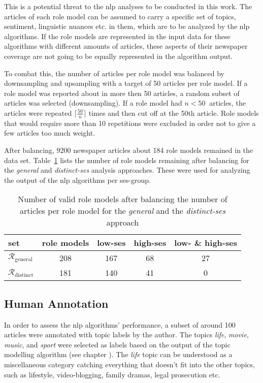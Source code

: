 This is a potential threat to the \gls{nlp} analyses to be conducted in this work. The articles of each role model can be assumed to carry a specific set of topics, sentiment, linguistic nuances etc. in them, which are to be analyzed by the \gls{nlp} algorithms. If the role models are represented in the input data for these algorithms with different amounts of articles, these aspects of their newspaper coverage are not going to be equally represented in the algorithm output.

To combat this, the number of articles per role model was balanced by downsampling and upsampling \autocite{kumar_5_2021} with a target of \SI{50}{} articles per role model. If a role model was reported about in more then \SI{50}{} articles, a random subset of articles was selected (downsampling). If a role model had $n < \SI{50}{}$ articles, the articles were repeated $\lceil \frac{50}{n} \rceil$ times and then cut off at the 50th article. Role models that would require more than \SI{10}{} repetitions were excluded in order not to give a few articles too much weight.

After balancing, \SI{9200}{} newspaper articles about \SI{184}{} role models remained in the data set. Table~\ref{tab:role_models_after_balancing} lists the number of role models remaining after balancing for the \textit{general} and \textit{distinct-\gls{ses}} analysis approaches. These were used for analyzing the output of the \gls{nlp} algorithms per \gls{ses}-group.

\begin{table}
    \centering
    \begin{tabular}{lcccc}
        \toprule 
        set & role models & low-\gls{ses} & high-\gls{ses} & low- \& high-\gls{ses} \\ \toprule 
        $\mathcal{R}_\text{general}$ & \SI{208}{} & \SI{167}{} & \SI{68}{} & \SI{27}{} \\
        $\mathcal{R}_\text{distinct}$ & \SI{181}{} & \SI{140}{} & \SI{41}{} & \SI{0}{} \\
        \bottomrule
    \end{tabular}
    \caption{Number of valid role models after balancing the number of articles per role model for the \textit{general} and the \textit{distinct-\gls{ses}} approach}
    \label{tab:role_models_after_balancing}
\end{table}

\subsection*{Human Annotation}
In order to assess the \gls{nlp} algorithms' performance, a subset of around \SI{100}{} articles were annotated with topic labels by the author. The topics \textit{life}, \textit{movie}, \textit{music}, and \textit{sport} were selected as labels based on the output of the topic modelling algorithm (see chapter ). The \textit{life} topic can be understood as a miscellaneous category catching everything that doesn't fit into the other topics, such as lifestyle, video-blogging, family dramas, legal prosecution etc.

